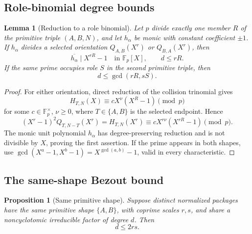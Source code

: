 \documentclass[11pt]{article}
\numberwithin{equation}{section}
\newtheorem{proposition}[theorem]{Proposition}
\newtheorem{lemma}[theorem]{Lemma}
\theoremstyle{definition}
\begin{document}
\subsection{Role-binomial degree bounds}

\begin{lemma}[Reduction to a role binomial]
\label{lem:rolebinomial}
Let \(p\) divide exactly one member \(R\) of the primitive triple
\((A,B,N)\), and let \(h_\alpha\) be monic with constant coefficient
\(\pm1\).  If \(h_\alpha\) divides a selected orientation
\(Q_{A,B}(X^r)\) or \(Q_{B,A}(X^r)\), then
\begin{equation}
 \overline{h_\alpha}\mid X^{rR}-1
 \quad\text{in }\mathbb F_p[X],
 \qquad d\leq rR.
 \label{eq:18-8}
\end{equation}
If the same prime occupies role \(S\) in the second primitive triple, then
\[
 d\leq\gcd(rR,sS).
\]
\end{lemma}

\begin{proof}
For either orientation, direct reduction of the collision trinomial gives
\[
 H_{T,N}(X)\equiv cX^\nu(X^R-1)\pmod p
\]
for some \(c\in\mathbb F_p^\times\), \(\nu\geq0\), where
\(T\in\{A,B\}\) is the selected endpoint.  Hence
\[
 (X^r-1)^2Q_{T,N-T}(X^r)=H_{T,N}(X^r)
 \equiv cX^{r\nu}(X^{rR}-1)\pmod p.
\]
The monic unit polynomial \(h_\alpha\) has degree-preserving reduction and is
not divisible by \(X\), proving the first assertion.  If the prime appears in
both shapes, use
\(\gcd(X^a-1,X^b-1)=X^{\gcd(a,b)}-1\), valid in every characteristic.
\end{proof}

\subsection{The same-shape Bezout bound}

\begin{proposition}[Same primitive shape]
\label{prop:sameshapebezout}
Suppose distinct normalized packages have the same primitive shape
\(\{A,B\}\), with coprime scales \(r,s\), and share a noncyclotomic
irreducible factor of degree \(d\).  Then
\begin{equation}
 d\leq2rs.
 \label{eq:18-9}
\end{equation}
\end{proposition}
\end{document}
